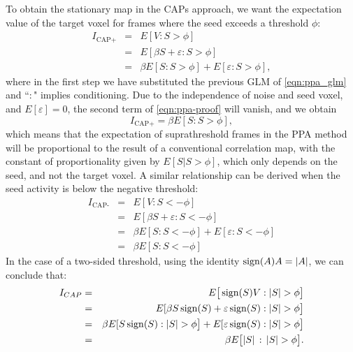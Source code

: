 To obtain the stationary map in the CAPs approach, we want the expectation value of the target voxel for frames where the seed exceeds a threshold $\phi$:
\begin{eqnarray}
  I_\text{CAP+} &=& E[V:S>\phi] \\
          &=& E[\beta S + \varepsilon : S>\phi] \\
          &=& \beta E[S : S>\phi] + E[\varepsilon  : S>\phi],    \label{eqn:ppa-proof}
\end{eqnarray}
where in the first step we have substituted the previous GLM of \ref{eqn:ppa_glm} and ``$:$" implies conditioning.
Due to the independence of noise and seed voxel, and $E[\varepsilon]=0$, the second term of \ref{eqn:ppa-proof} will vanish, and we obtain
\begin{equation}
 I_\text{CAP+} = \beta E[S : S > \phi],
\end{equation}
which means that the expectation of suprathreshold frames in the PPA method will be proportional to the result of a conventional correlation map, with the constant of proportionality given by $E[S|S > \phi]$, which only depends on the seed, and not the target voxel. A similar relationship can be derived when the seed activity is below the negative threshold: 
\begin{eqnarray}
  I_\text{CAP-} &=& E[V : S<-\phi] \\
          &=& E[\beta S + \varepsilon : S<-\phi] \\
          &=& \beta E[S : S<-\phi] + E[\varepsilon  : S<-\phi] \\
          &=& \beta E[S : S<-\phi]
\end{eqnarray}
In the case of a two-sided threshold, using the identity $\operatorname*{sign}(A)A = |A|$, we can conclude that: 
\begin{eqnarray}
  I_{CAP} &=& E\big[\sign(S)V : \left| S \right|>\phi\big] \\
   &=& E[\beta S\sign(S) + \varepsilon\sign(S) : \left| S \right|>\phi\big] \\
          &=& \beta E[S\sign(S)  : \left| S \right|>\phi\big] + E[\varepsilon \sign(S)  : \left| S \right|>\phi\big] \\
               &=& \beta E\big[|S|\, : \, \left|S \right| > \phi\big].
\end{eqnarray}



